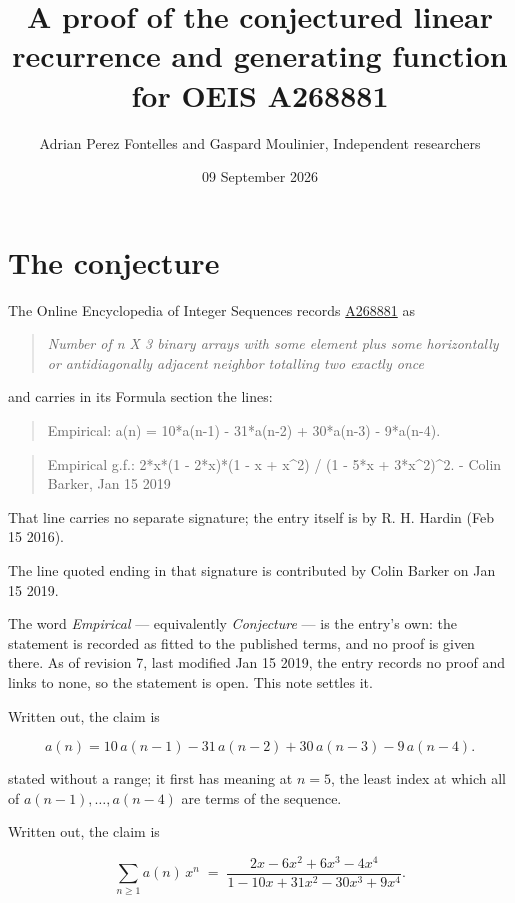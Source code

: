 \documentclass[11pt]{article}
\title{A proof of the conjectured linear recurrence and generating function for OEIS A268881}
\author{Adrian Perez Fontelles and Gaspard Moulinier, Independent researchers}
\date{09 September 2026}
\theoremstyle{definition}
\begin{document}
\maketitle
\section{The conjecture}

The Online Encyclopedia of Integer Sequences records \href{https://oeis.org/A268881}{A268881} as

\begin{quote}\itshape Number of n X 3 binary arrays with some element plus some horizontally or antidiagonally adjacent neighbor totalling two exactly once\end{quote}

and carries in its Formula section the lines:

\begin{quote}\ttfamily Empirical: a(n) = 10*a(n-1) - 31*a(n-2) + 30*a(n-3) - 9*a(n-4).\end{quote}

\begin{quote}\ttfamily Empirical g.f.: 2*x*(1 - 2*x)*(1 - x + x\textasciicircum{}2) / (1 - 5*x + 3*x\textasciicircum{}2)\textasciicircum{}2. - Colin Barker, Jan 15 2019\end{quote}

That line carries no separate signature; the entry itself is by R. H. Hardin (Feb 15 2016).

The line quoted ending in that signature is contributed by Colin Barker on Jan 15 2019.

The word {\itshape Empirical} --- equivalently {\itshape Conjecture} --- is the entry's own: the statement is recorded as fitted to the published terms, and no proof is given there. As of revision 7, last modified Jan 15 2019, the entry records no proof and links to none, so the statement is open. This note settles it.

Written out, the claim is

\[a(n) = 10\,a(n-1) - 31\,a(n-2) + 30\,a(n-3) - 9\,a(n-4).\]

stated without a range; it first has meaning at $n = 5$, the least index at which all of $a(n-1),\dots,a(n-4)$ are terms of the sequence.

Written out, the claim is

\[\sum_{n \ge 1} a(n)\,x^n \;=\; \frac{2x - 6x^{2} + 6x^{3} - 4x^{4}}{1 - 10x + 31x^{2} - 30x^{3} + 9x^{4}}.\]
\end{document}

